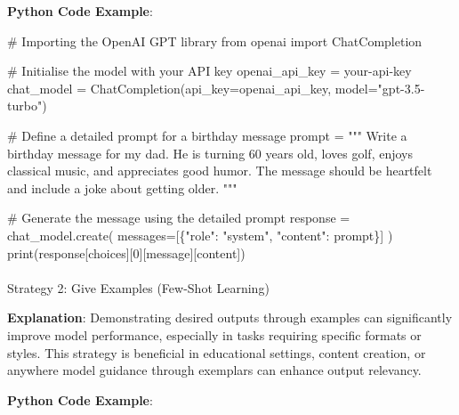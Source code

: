 \documentclass[
]{agujournal2019}
\makeatletter
\let\oldparagraph\paragraph
\renewcommand{\paragraph}{
    \@ifstar
      \xxxParagraphStar
      \xxxParagraphNoStar
  }
\newcommand{\xxxParagraphStar}[1]{\oldparagraph*{#1}\mbox{}}
\newcommand{\xxxParagraphNoStar}[1]{\oldparagraph{#1}\mbox{}}
\newenvironment{Shaded}{\begin{snugshade}}{\end{snugshade}}
\newcommand{\BuiltInTok}[1]{\textcolor[rgb]{0.00,0.23,0.31}{#1}}
\newcommand{\CommentTok}[1]{\textcolor[rgb]{0.37,0.37,0.37}{#1}}
\newcommand{\DecValTok}[1]{\textcolor[rgb]{0.68,0.00,0.00}{#1}}
\newcommand{\ImportTok}[1]{\textcolor[rgb]{0.00,0.46,0.62}{#1}}
\newcommand{\NormalTok}[1]{\textcolor[rgb]{0.00,0.23,0.31}{#1}}
\newcommand{\OperatorTok}[1]{\textcolor[rgb]{0.37,0.37,0.37}{#1}}
\newcommand{\StringTok}[1]{\textcolor[rgb]{0.13,0.47,0.30}{#1}}
\makeatother
\begin{document}
\textbf{Python Code Example}:

\begin{Shaded}
\begin{Highlighting}[]
\CommentTok{\# Importing the OpenAI GPT library}
\ImportTok{from}\NormalTok{ openai }\ImportTok{import}\NormalTok{ ChatCompletion}

\CommentTok{\# Initialise the model with your API key}
\NormalTok{openai\_api\_key }\OperatorTok{=} \StringTok{\textquotesingle{}your{-}api{-}key\textquotesingle{}}
\NormalTok{chat\_model }\OperatorTok{=}\NormalTok{ ChatCompletion(api\_key}\OperatorTok{=}\NormalTok{openai\_api\_key, model}\OperatorTok{=}\StringTok{"gpt{-}3.5{-}turbo"}\NormalTok{)}

\CommentTok{\# Define a detailed prompt for a birthday message}
\NormalTok{prompt }\OperatorTok{=} \StringTok{"""}
\StringTok{Write a birthday message for my dad. He is turning 60 years old, loves golf, enjoys classical music, and appreciates good humor. The message should be heartfelt and include a joke about getting older.}
\StringTok{"""}

\CommentTok{\# Generate the message using the detailed prompt}
\NormalTok{response }\OperatorTok{=}\NormalTok{ chat\_model.create(}
\NormalTok{    messages}\OperatorTok{=}\NormalTok{[\{}\StringTok{"role"}\NormalTok{: }\StringTok{"system"}\NormalTok{, }\StringTok{"content"}\NormalTok{: prompt\}]}
\NormalTok{)}
\BuiltInTok{print}\NormalTok{(response[}\StringTok{\textquotesingle{}choices\textquotesingle{}}\NormalTok{][}\DecValTok{0}\NormalTok{][}\StringTok{\textquotesingle{}message\textquotesingle{}}\NormalTok{][}\StringTok{\textquotesingle{}content\textquotesingle{}}\NormalTok{])}
\end{Highlighting}
\end{Shaded}

\paragraph{Strategy 2: Give Examples (Few-Shot
Learning)}\label{strategy-2-give-examples-few-shot-learning}

\textbf{Explanation}: Demonstrating desired outputs through examples can
significantly improve model performance, especially in tasks requiring
specific formats or styles. This strategy is beneficial in educational
settings, content creation, or anywhere model guidance through exemplars
can enhance output relevancy.

\textbf{Python Code Example}:
\end{document}
